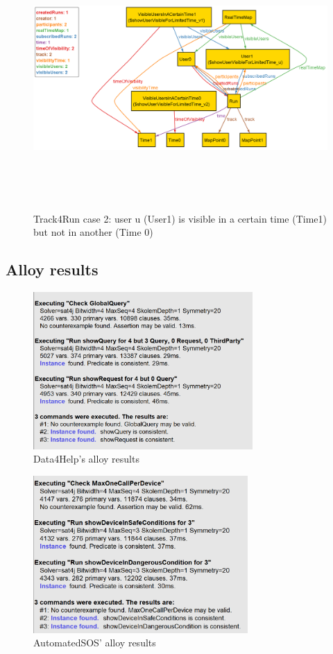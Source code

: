 \begin{figure}[H]
\includegraphics[width=\linewidth, height=10cm, keepaspectratio]{./Images/Alloy/track4run_v2_2.png}
\centering
\caption{Track4Run case 2: user u (User1) is visible in a certain time (Time1) but not in another (Time 0)}
\end{figure}
\newpage
{\color{secblue}\subsection{Alloy results}}
\begin{figure}[H]
\includegraphics[width=\linewidth, height=6cm, keepaspectratio]{./Images/Alloy/data4help_results.png}
\centering
\caption{Data4Help's alloy results}
\end{figure}

\begin{figure}[H]
\includegraphics[width=\linewidth, height=6cm, keepaspectratio]{./Images/Alloy/automatedSOS_results.png}
\centering
\caption{AutomatedSOS' alloy results}
\end{figure}

